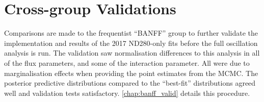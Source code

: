 \section{Cross-group Validations}
Comparisons are made to the frequentist ``BANFF'' group to further validate the implementation and results of the 2017 ND280-only fits before the full oscillation analysis is run. The validation saw normalisation differences to this analysis in all of the flux parameters, and some of the interaction parameter. All were due to marginalisation effects when providing the point estimates from the MCMC. The posterior predictive distributions compared to the ``best-fit'' distributions agreed well and validation tests satisfactory. \autoref{chap:banff_valid} details this procedure.
